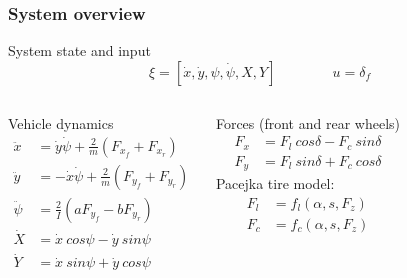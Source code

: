 \documentclass{beamer}
\begin{document}
\begin{frame}
\frametitle{System overview}

\begin{block}{System state and input}
\[\xi = [\dot{x}, \dot{y}, \psi, \dot{\psi}, X, Y] \qquad \qquad u = \delta_f\]
\end{block}

\begin{columns}[t,onlytextwidth]
\begin{block}{Vehicle dynamics}
\begin{align*}
\ddot{x} &= \dot{y} \dot{\psi} + \frac{2}{m} (F_{x_f} + F_{x_r}) \\
\ddot{y} &= - \dot{x} \dot{\psi} + \frac{2}{m} (F_{y_f} + F_{y_r}) \\
\ddot{\psi} &= \frac{2}{I} (a F_{y_f} - b F_{y_r}) \\
\dot{X} &= \dot{x} \ cos \psi - \dot{y} \ sin \psi \\
\dot{Y} &= \dot{x} \ sin \psi + \dot{y} \ cos \psi
\end{align*}
\end{block}

\begin{block}{Forces (front and rear wheels)}
\begin{align*}
F_x &= F_l \ cos \delta - F_c \ sin \delta \\
F_y &= F_l \ sin \delta + F_c \ cos \delta
\end{align*}
Pacejka tire model:
\begin{align*}
F_l &= f_l(\alpha, s, F_z) \\
F_c &= f_c(\alpha, s, F_z)
\end{align*}
\end{block}

\end{columns}

\end{frame}
\end{document}
